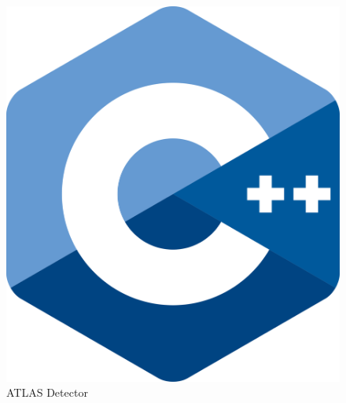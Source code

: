 \documentclass[aspectratio-169]{beamer}
\begin{document}
\begin{frame}
\begin{figure}
\begin{minipage}[b]{0.4\textwidth}
        \caption{ATLAS Detector}
    \end{minipage}
    \hfill
    \begin{minipage}[b]{0.15\textwidth}
        \includegraphics[width=\textwidth]{ISO_C++_Logo.svg.png}
    \end{minipage}
\end{figure}
\end{frame}

\end{document}
